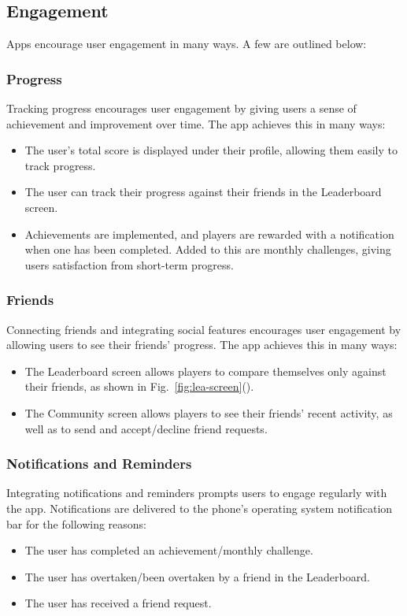\documentclass{report_template_oxford}
\begin{document}
\subsection{Engagement}

Apps encourage user engagement in many ways. A few are outlined below: 

\subsubsection{Progress}
Tracking progress encourages user engagement by giving users a sense of achievement and improvement over time. The app achieves this in many ways:
\begin{itemize}
    \item The user's total score is displayed under their profile, allowing them easily to track progress.
    \item The user can track their progress against their friends in the Leaderboard screen.
    \item Achievements are implemented, and players are rewarded with a notification when one has been completed. Added to this are monthly challenges, giving users satisfaction from short-term progress.
\end{itemize}
\subsubsection{Friends}
Connecting friends and integrating social features encourages user engagement by allowing users to see their friends' progress. The app achieves this in many ways:
\begin{itemize}
    \item The Leaderboard screen allows players to compare themselves only against their friends, as shown in Fig.~\ref{fig:lea-screen}().
    \item The Community screen allows players to see their friends' recent activity, as well as to send and accept/decline friend requests.
\end{itemize}
\subsubsection{Notifications and Reminders}
Integrating notifications and reminders prompts users to engage regularly with the app. Notifications are delivered to the phone's operating system notification bar for the following reasons:
\begin{itemize}
    \item The user has completed an achievement/monthly challenge.
    \item The user has overtaken/been overtaken by a friend in the Leaderboard.
    \item The user has received a friend request.
\end{itemize}
\end{document}
